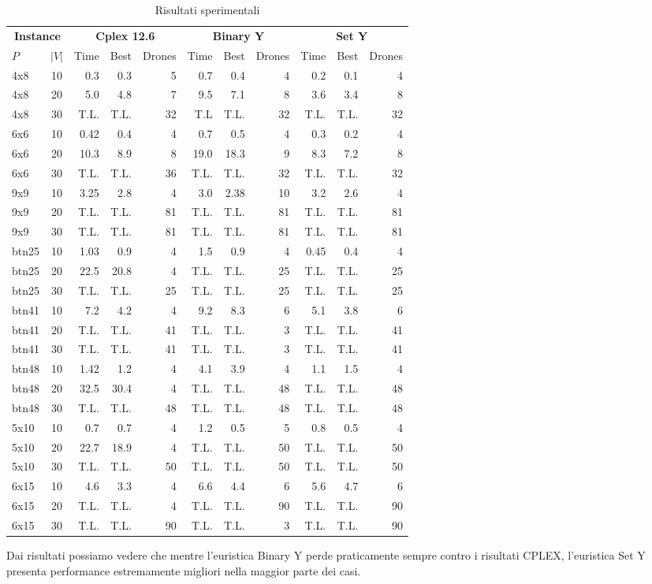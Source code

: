 \begin{table} 
	\scriptsize
	\center
	\begin{tabular}{lc|rrr|rrr|rrr}
		\hline
		\multicolumn{2}{c}{\bf Instance} & \multicolumn{3}{|c}{{\bf Cplex 12.6}} & \multicolumn{3}{|c}{{\bf Binary Y}} & \multicolumn{3}{|c}{{\bf Set Y}}\\
		{\bf $P$} & $|V|$ & Time & Best & Drones & Time & Best & Drones & Time & Best & Drones \\
		\hline
		4x8 & 10 & 0.3 & 0.3 & 5 & 0.7 & 0.4 & 4 & 0.2 & 0.1 & 4 \\
		4x8 & 20 & 5.0 & 4.8 & 7 & 9.5 & 7.1 & 8 & 3.6 & 3.4 & 8 \\
		4x8 & 30 & T.L. & T.L. & 32 & T.L & T.L. & 32 & T.L. & T.L. & 32 \\
		6x6 & 10 & 0.42 & 0.4 & 4 & 0.7 & 0.5 & 4 & 0.3 & 0.2 & 4 \\
		6x6 & 20 & 10.3 & 8.9 & 8 & 19.0 & 18.3 & 9 & 8.3 & 7.2 & 8 \\
		6x6 & 30 & T.L. & T.L. & 36 & T.L. & T.L. & 32 & T.L. & T.L. & 32 \\
		9x9 & 10 & 3.25 & 2.8 & 4 & 3.0 & 2.38 & 10 & 3.2 & 2.6 & 4 \\
		9x9 & 20 & T.L. & T.L. & 81 & T.L. & T.L. & 81 & T.L. & T.L. & 81 \\
		9x9 & 30 & T.L. & T.L. & 81 & T.L. & T.L. & 81 & T.L. & T.L. & 81 \\
		btn25 & 10 & 1.03 & 0.9 & 4 & 1.5 & 0.9 & 4 & 0.45 & 0.4 & 4 \\
		btn25 & 20 & 22.5 & 20.8 & 4 & T.L. & T.L. & 25 & T.L. & T.L. & 25 \\
		btn25 & 30 & T.L. & T.L. & 25 & T.L. & T.L. & 25 & T.L. & T.L. & 25 \\
		btn41 & 10 & 7.2 & 4.2 & 4 & 9.2 & 8.3 & 6 & 5.1 & 3.8 & 6 \\
		btn41 & 20 & T.L. & T.L. & 41 & T.L. & T.L. & 3 & T.L. & T.L. & 41 \\
		btn41 & 30 & T.L. & T.L. & 41 & T.L. & T.L. & 3 & T.L. & T.L. & 41 \\
		btn48 & 10 & 1.42 & 1.2 & 4 & 4.1 & 3.9 & 4 & 1.1 & 1.5 & 4 \\
		btn48 & 20 & 32.5 & 30.4 & 4 & T.L. & T.L. & 48 & T.L. & T.L. & 48 \\
		btn48 & 30 & T.L. & T.L. & 48 & T.L. & T.L. & 48 & T.L. & T.L. & 48 \\
		5x10 & 10 & 0.7 & 0.7 & 4 & 1.2 & 0.5 & 5 & 0.8 & 0.5 & 4 \\
		5x10 & 20 & 22.7 & 18.9 & 4 & T.L. & T.L. & 50 & T.L. & T.L. & 50 \\
		5x10 & 30 & T.L. & T.L. & 50 & T.L. & T.L. & 50 & T.L. & T.L. & 50 \\
		6x15 & 10 & 4.6 & 3.3 & 4 & 6.6 & 4.4 & 6 & 5.6 & 4.7 & 6 \\
		6x15 & 20 & T.L. & T.L. & 4 & T.L. & T.L. & 90 & T.L. & T.L. & 90 \\
		6x15 & 30 & T.L. & T.L. & 90 & T.L. & T.L. & 3 & T.L. & T.L. & 90 \\
		\hline
	\end{tabular}
	\normalsize
	\caption{Risultati sperimentali} 
	\label{tabRes}
\end{table}
%

Dai risultati possiamo vedere che mentre l'euristica Binary Y perde praticamente sempre contro i risultati CPLEX, l'euristica Set Y presenta performance estremamente migliori nella maggior parte dei casi. \\ 




